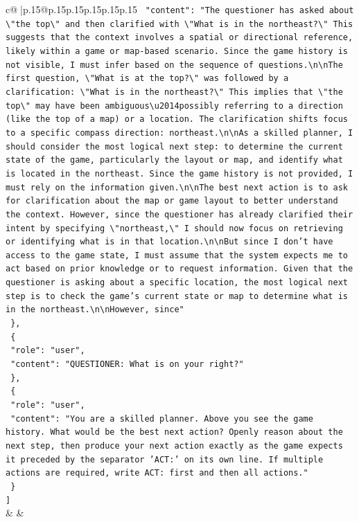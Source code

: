 \documentclass{article}
\begin{document}
{\begin{supertabular}{c@{$\;$}|p{.15\linewidth}@{}p{.15\linewidth}p{.15\linewidth}p{.15\linewidth}p{.15\linewidth}p{.15\linewidth}}
{{{\texttt{    "content": "The questioner has asked about \textbackslash{}"the top\textbackslash{}" and then clarified with \textbackslash{}"What is in the northeast?\textbackslash{}" This suggests that the context involves a spatial or directional reference, likely within a game or map{-}based scenario. Since the game history is not visible, I must infer based on the sequence of questions.\textbackslash{}n\textbackslash{}nThe first question, \textbackslash{}"What is at the top?\textbackslash{}" was followed by a clarification: \textbackslash{}"What is in the northeast?\textbackslash{}" This implies that \textbackslash{}"the top\textbackslash{}" may have been ambiguous\textbackslash{}u2014possibly referring to a direction (like the top of a map) or a location. The clarification shifts focus to a specific compass direction: northeast.\textbackslash{}n\textbackslash{}nAs a skilled planner, I should consider the most logical next step: to determine the current state of the game, particularly the layout or map, and identify what is located in the northeast. Since the game history is not provided, I must rely on the information given.\textbackslash{}n\textbackslash{}nThe best next action is to ask for clarification about the map or game layout to better understand the context. However, since the questioner has already clarified their intent by specifying \textbackslash{}"northeast,\textbackslash{}" I should now focus on retrieving or identifying what is in that location.\textbackslash{}n\textbackslash{}nBut since I don't have access to the game state, I must assume that the system expects me to act based on prior knowledge or to request information. Given that the questioner is asking about a specific location, the most logical next step is to check the game's current state or map to determine what is in the northeast.\textbackslash{}n\textbackslash{}nHowever, since"} \\
\texttt{  \},} \\
\texttt{  \{} \\
\texttt{    "role": "user",} \\
\texttt{    "content": "QUESTIONER: What is on your right?"} \\
\texttt{  \},} \\
\texttt{  \{} \\
\texttt{    "role": "user",} \\
\texttt{    "content": "You are a skilled planner. Above you see the game history. What would be the best next action? Openly reason about the next step, then produce your next action exactly as the game expects it preceded by the separator 'ACT:' on its own line. If multiple actions are required, write ACT: first and then all actions."} \\
\texttt{  \}} \\
\texttt{{]}} \\
            }
        }
    }
    & & \\ \\


\end{supertabular}}
\end{document}
